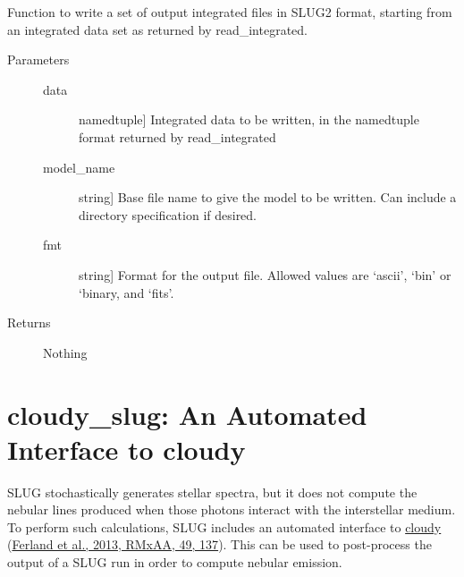 \documentclass[letterpaper,10pt,english]{sphinxmanual}
\begin{document}
\begin{fulllineitems}
\label{slugpy:slugpy.write_integrated}
Function to write a set of output integrated files in SLUG2 format,
starting from an integrated data set as returned by
read\_integrated.
\begin{description}
\item[{Parameters}] \leavevmode\begin{description}
\item[{data}] \leavevmode{[}namedtuple{]}
Integrated data to be written, in the namedtuple format returned
by read\_integrated

\item[{model\_name}] \leavevmode{[}string{]}
Base file name to give the model to be written. Can include a
directory specification if desired.

\item[{fmt}] \leavevmode{[}string{]}
Format for the output file. Allowed values are `ascii', `bin'
or `binary, and `fits'.

\end{description}

\item[{Returns}] \leavevmode
Nothing

\end{description}

\end{fulllineitems}



\chapter{cloudy\_slug: An Automated Interface to cloudy}
\label{cloudy:cloudy-slug-an-automated-interface-to-cloudy}\label{cloudy::doc}\label{cloudy:sec-cloudy-slug}
SLUG stochastically generates stellar spectra, but it does not compute
the nebular lines produced when those photons interact with the
interstellar medium. To perform such calculations, SLUG includes an
automated interface to \href{http://nublado.org/}{cloudy} (\href{http://adsabs.harvard.edu/abs/2013RMxAA..49..137F}{Ferland et
al., 2013, RMxAA, 49, 137}). This can be
used to post-process the output of a SLUG run in order to compute
nebular emission.
\end{document}
